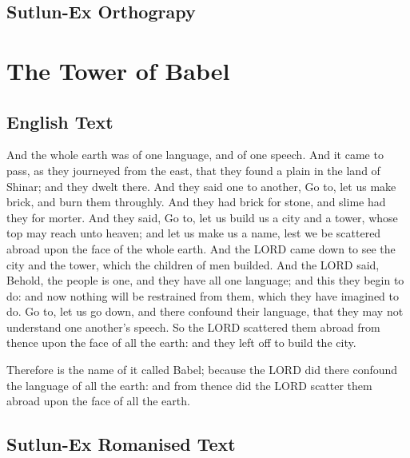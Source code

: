 \documentclass{book}
\begin{document}
\section{Sutlun-Ex Orthograpy}


\chapter{The Tower of Babel}
\section{English Text}

    And the whole earth was of one language, and of one speech.
    And it came to pass, as they journeyed from the east, that they found a plain in the land of Shinar;
    and they dwelt there.
    And they said one to another, Go to, let us make brick, and burn them throughly.
    And they had brick for stone, and slime had they for morter.
    And they said, Go to, let us build us a city and a tower, whose top may reach unto heaven;
    and let us make us a name, lest we be scattered abroad upon the face of the whole earth.
    And the LORD came down to see the city and the tower, which the children of men builded.
    And the LORD said, Behold, the people is one, and they have all one language; and this they begin to do:
    and now nothing will be restrained from them, which they have imagined to do.
    Go to, let us go down, and there confound their language, that they may not understand one another's speech.
    So the LORD scattered them abroad from thence upon the face of all the earth: and they left off to build the city.

    Therefore is the name of it called Babel; because the LORD did there confound the language of all the earth:
    and from thence did the LORD scatter them abroad upon the face of all the earth.

\section{Sutlun-Ex Romanised Text}
\end{document}
